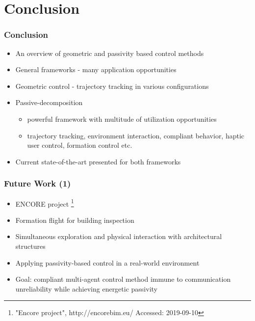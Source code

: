 \section{Conclusion}

\begin{frame}
	\frametitle{Conclusion}
	
	\begin{itemize}
		\item An overview of geometric and passivity based control methods
		\item General frameworks - many application opportunities
		\item Geometric control - trajectory tracking in various configurations
		\item Passive-decomposition
		\begin{itemize}
			 \item powerful framework with multitude of utilization opportunities
			 \item trajectory tracking, environment interaction, compliant behavior, haptic user control, formation control etc.
		\end{itemize}
		\item Current state-of-the-art presented for both frameworks
	\end{itemize}
\end{frame}

\begin{frame}
	\frametitle{Future Work (1)}
	\begin{itemize}
		\item ENCORE project \footnote{"Encore project", http://encorebim.eu/ Accessed: 2019-09-10}
		\item Formation flight for building inspection
		\item Simultaneous exploration and physical interaction with architectural structures
		\item Applying passivity-based control in a real-world environment
		\item Goal: compliant multi-agent control method immune to communication unreliability while achieving energetic passivity
	\end{itemize}
\end{frame}


